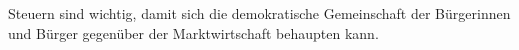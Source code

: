 Steuern sind wichtig, damit sich die demokratische Gemeinschaft der Bürgerinnen und Bürger gegenüber der Marktwirtschaft behaupten kann.